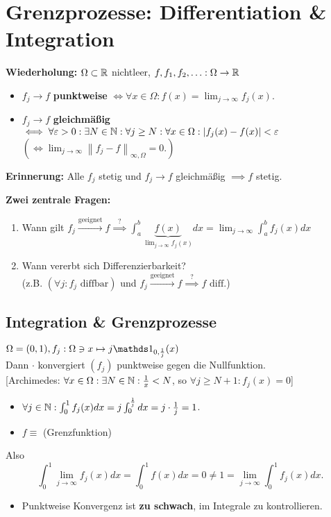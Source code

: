 \section{Grenzprozesse: Differentiation \& Integration}
\textbf{Wiederholung:} $ \Omega \subset \mathbb{R}  $ nichtleer, $ f, f_1, f_2, \dotsc : \Omega \to \mathbb{R}  $ 
\begin{itemize}
	\item $ f_j \to f $ \textbf{punktweise} $ \iff \forall x \in \Omega : f(x) = \lim_{j \to \infty} f_j (x) $.
	\item $ f_j \to f $ \textbf{gleichmäßig} $ \iff \forall \varepsilon > 0 : \exists N \in \mathbb{N} : \forall j \geq N : \forall x \in \Omega : \left| f_j(x) - f(x) \right| < \varepsilon  $\\
		$ \left( \iff \lim_{j \to \infty} \left\| f_j - f \right\| _{\infty, \Omega} = 0. \right) $
\end{itemize}

\textbf{Erinnerung:} Alle $ f_j $ stetig und $ f_j \to f $ gleichmäßig $ \implies f $ stetig.\\
{
\color{gadse-red}
\textbf{Zwei zentrale Fragen:}
\begin{enumerate}[label=(\alph*)]
	\item Wann gilt $ f_j \overset{\text{geeignet} }{\to } f \overset{?}{\implies } \int_{a}^{b}\underbrace{f(x)}_{\lim_{j \to \infty} f_j(x)} dx = \lim_{j \to \infty} \int_{a}^{b} f_j(x)dx $ 
	\item Wann vererbt sich Differenzierbarkeit?\\
		(z.B. $ \left( \forall j : f_j\text{ diffbar}  \right)  $ und $ f_j \overset{\text{geeignet} }{\to } f \overset{?}{\implies } f \text{ diff.}  $)
\end{enumerate}

}

\subsection{Integration \& Grenzprozesse}
\begin{subexample}
	$ \Omega = (0, 1), f_j : \Omega \ni x \mapsto j \I_{0, \frac{ 1 }{ j } } (x) $\\
	Dann $ \cdot  $ konvergiert $ (f_j) $ punktweise gegen die Nullfunktion.\\
	{[Archimedes: $ \forall x \in \Omega : \exists N \in \mathbb{N} : \frac{ 1 }{ x } < N $, so $ \forall j \geq N + 1 : f_j(x) = 0 $]}
	\begin{itemize}
		\item  $ \forall j \in \mathbb{N} : \int_{0}^{1}f_j(x) dx = j \int_{0}^{\frac{ 1 }{ j } }dx = j \cdot \frac{ 1 }{ j } = 1 $.
		\item $ f \equiv $ (Grenzfunktion)
	\end{itemize}
	Also
	\[
		\int_{0}^{1}\lim_{j \to \infty} f_j(x) dx = \int_{0}^{1}f(x) dx = 0 \neq 1 = \lim_{j \to \infty} \int_{0}^{1} f_j(x) dx.
	\]
	\begin{itemize}
		\item Punktweise Konvergenz ist \textbf{zu schwach}, im Integrale zu kontrollieren.
	\end{itemize}
	
\end{subexample}

